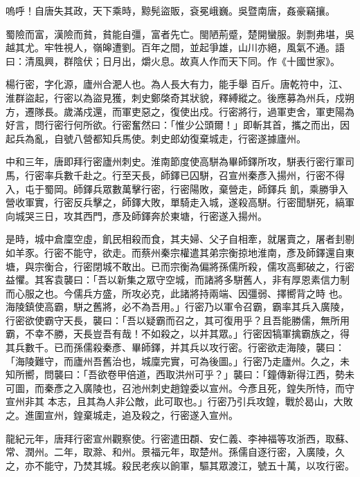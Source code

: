 
\begin{pinyinscope}

 嗚呼！自唐失其政，天下乘時，黥髡盜販，袞冕峨巍。吳暨南唐，姦豪竊攘。



 蜀險而富，漢險而貧，貧能自彊，富者先亡。閩陋荊蹙，楚開蠻服。剝剽弗堪，吳越其尤。牢牲視人，嶺皞遭劉。百年之間，並起爭雄，山川亦絕，風氣不通。語曰：清風興，群陰伏；日月出，爝火息。故真人作而天下同。作《十國世家》。



 楊行密，字化源，廬州合淝人也。為人長大有力，能手舉
 百斤。唐乾符中，江、淮群盜起，行密以為盜見獲，刺史鄭棨奇其狀貌，釋縛縱之。後應募為州兵，戍朔方，遷隊長。歲滿戍還，而軍吏惡之，復使出戍。行密將行，過軍吏舍，軍吏陽為好言，問行密行何所欲。行密奮然曰：「惟少公頭爾！」即斬其首，攜之而出，因起兵為亂，自號八營都知兵馬使。刺史郎幼復棄城走，行密遂據廬州。



 中和三年，唐即拜行密廬州刺史。淮南節度使高駢為畢師鐸所攻，駢表行密行軍司馬，行密率兵數千赴之。行至天長，師鐸已囚駢，召宣州秦彥入揚州，行密不得入，屯于蜀岡。師鐸兵眾數萬擊行密，行密陽敗，棄營走，師鐸兵
 飢，乘勝爭入營收軍實，行密反兵擊之，師鐸大敗，單騎走入城，遂殺高駢。行密聞駢死，縞軍向城哭三日，攻其西門，彥及師鐸奔於東塘，行密遂入揚州。



 是時，城中倉廩空虛，飢民相殺而食，其夫婦、父子自相牽，就屠賣之，屠者刲剔如羊豕。行密不能守，欲走。而蔡州秦宗權遣其弟宗衡掠地淮南，彥及師鐸還自東塘，與宗衡合，行密閉城不敢出。已而宗衡為偏將孫儒所殺，儒攻高郵破之，行密益懼。其客袁襲曰：「吾以新集之眾守空城，而諸將多駢舊人，非有厚恩素信力制而心服之也。今儒兵方盛，所攻必克，此諸將持兩端、因彊弱、擇嚮背之時
 也。海陵鎮使高霸，駢之舊將，必不為吾用。」行密乃以軍令召霸，霸率其兵入廣陵，行密欲使霸守天長，襲曰：「吾以疑霸而召之，其可復用乎？且吾能勝儒，無所用霸，不幸不勝，天長豈吾有哉！不如殺之，以并其眾。」行密因犒軍擒霸族之，得其兵數千。已而孫儒殺秦彥、畢師鐸，并其兵以攻行密。行密欲走海陵，襲曰：「海陵難守，而廬州吾舊治也，城廩完實，可為後圖。」行密乃走廬州。久之，未知所嚮，問襲曰：「吾欲卷甲倍道，西取洪州可乎？」襲曰：「鐘傳新得江西，勢未可圖，而秦彥之入廣陵也，召池州刺史趙鍠委以宣州。今彥且死，鍠失所恃，而守宣州非其
 本志，且其為人非公敵，此可取也。」行密乃引兵攻鍠，戰於曷山，大敗之。進圍宣州，鍠棄城走，追及殺之，行密遂入宣州。



 龍紀元年，唐拜行密宣州觀察使。行密遣田頵、安仁義、李神福等攻浙西，取蘇、常、潤州。二年，取滁、和州。景福元年，取楚州。孫儒自逐行密，入廣陵，久之，亦不能守，乃焚其城。殺民老疾以餉軍，驅其眾渡江，號五十萬，以攻行密。




\end{pinyinscope}
